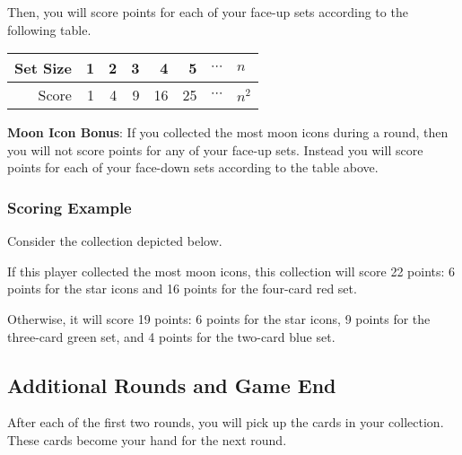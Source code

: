 \documentclass[a6paper, parskip=half, DIV=14, 10pt]{scrartcl}
\begin{document}
Then, you will score points for each of your face-up sets according to the following table.

\begin{center}
{
\begin{tabular}{r rrrrrcl} \toprule
Set Size & 1 & 2 & 3 & 4 & 5 & $\cdots$ & $n$\\ \midrule
Score & \phantom{0}1 & \phantom{0}4 & \phantom{0}9 & 16 & 25 & $\cdots$ & $n^2$ \\\bottomrule
\end{tabular}
}
\end{center}

\textbf{Moon Icon Bonus}: If you collected the most moon icons during a round, then you will not score points for any of your face-up sets. 
Instead you will score points for each of your face-down sets according to the table above.

\newpage

\subsubsection*{Scoring Example}
Consider the collection depicted below. 

\begin{center}
    \hfill {}   \hfill {} 
\end{center}

If this player collected the most moon icons, this collection will score 22 points: 6 points for the star icons and 16 points for the four-card red set. 

Otherwise, it will score 19 points: 6 points for the star icons, 9 points for the three-card green set, and 4 points for the two-card blue set.

\vfill

\subsection*{Additional Rounds and Game End}
After each of the first two rounds, you will pick up the cards in your collection.
These cards become your hand for the next round.
\end{document}
